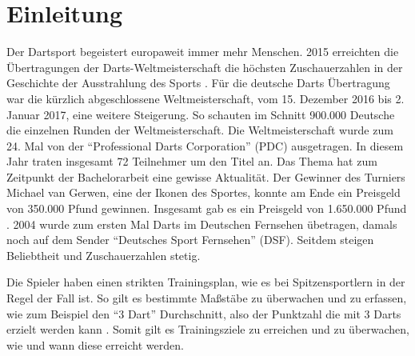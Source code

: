 
\chapter{Einleitung}
\label{chap:intro}



Der Dartsport begeistert europaweit immer mehr Menschen. 2015 erreichten die Übertragungen der Darts-Weltmeisterschaft die höchsten Zuschauerzahlen in der Geschichte der Ausstrahlung des Sports \autocite{quotenmeter2017}. Für die deutsche Darts Übertragung war die kürzlich abgeschlossene Weltmeisterschaft, vom 15. Dezember 2016 bis 2. Januar 2017, eine weitere Steigerung. So schauten im Schnitt 900.000 Deutsche die einzelnen Runden der Weltmeisterschaft. Die Weltmeisterschaft wurde zum 24. Mal von der "`Professional Darts Corporation"' (PDC) ausgetragen. In diesem Jahr traten insgesamt 72 Teilnehmer um den Titel an. Das Thema hat zum Zeitpunkt der Bachelorarbeit eine gewisse Aktualität. 
Der Gewinner des Turniers Michael van Gerwen, eine der Ikonen des Sportes, konnte am Ende ein Preisgeld von 350.000 Pfund gewinnen. Insgesamt gab es ein Preisgeld von 1.650.000 Pfund \autocite{PDC2016}.
2004 wurde zum ersten Mal Darts im Deutschen Fernsehen übetragen, damals noch auf dem Sender "`Deutsches Sport Fernsehen"' (DSF)\autocite{GaOn2016}. Seitdem steigen Beliebtheit und Zuschauerzahlen stetig.

Die Spieler haben einen strikten Trainingsplan, wie es bei Spitzensportlern in der Regel der Fall ist. So gilt es bestimmte Maßstäbe zu überwachen und zu erfassen, wie zum Beispiel den "`3 Dart"' Durchschnitt, also der Punktzahl die mit 3 Darts erzielt werden kann \autocite[98-100]{dph2015}.
Somit gilt es Trainingsziele zu erreichen und zu überwachen, wie und wann diese erreicht werden.

